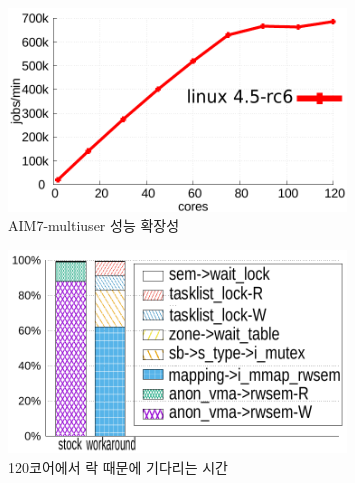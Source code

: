 \begin{figure}[h]
    \centering
    \includegraphics[width=0.8\textwidth]{graph/aim7_default}
    \caption{AIM7-multiuser 성능 확장성}
  \label{fig:aim7_default}
\end{figure}

\begin{figure}[h]
    \centering
    \includegraphics[width=0.8\textwidth]{graph/lockstat}
    \caption{120코어에서 락 때문에 기다리는 시간}
  \label{fig:aim7_default}
\end{figure}



